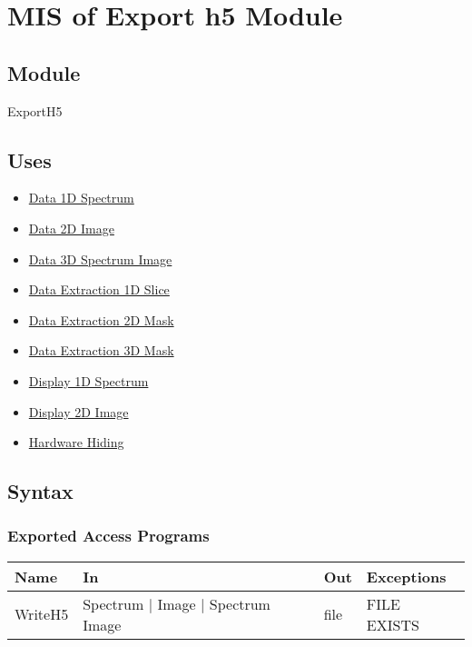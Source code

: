 \documentclass[12pt, titlepage]{article}
\begin{document}
\section{MIS of Export h5 Module} \label{Mod:ExportH5}

\subsection{Module}

ExportH5

\subsection{Uses}
\begin{itemize}
    \item \hyperref[Mod:Spectrum]{Data 1D Spectrum}
    \item \hyperref[Mod:Image]{Data 2D Image}
    \item \hyperref[Mod:SI]{Data 3D Spectrum Image}
    \item \hyperref[Mod:Slice1D]{Data Extraction 1D Slice}
    \item \hyperref[Mod:Mask2D]{Data Extraction 2D Mask}
    \item \hyperref[Mod:Mask3D]{Data Extraction 3D Mask}
    \item \hyperref[Mod:Disp1D]{Display 1D Spectrum}
    \item \hyperref[Mod:Disp2D]{Display 2D Image}
    \item \hyperref[Mod:HH]{Hardware Hiding}
\end{itemize}

\subsection{Syntax}

\subsubsection{Exported Access Programs}

\begin{center}
\begin{tabular}{p{2cm} p{4cm} p{2cm} p{4cm}}
\hline
\textbf{Name} & \textbf{In} & \textbf{Out} & \textbf{Exceptions} \\
\hline
WriteH5 & Spectrum $|$ Image $|$ Spectrum Image & file & FILE EXISTS \\
\hline
\end{tabular}
\end{center}
\end{document}
